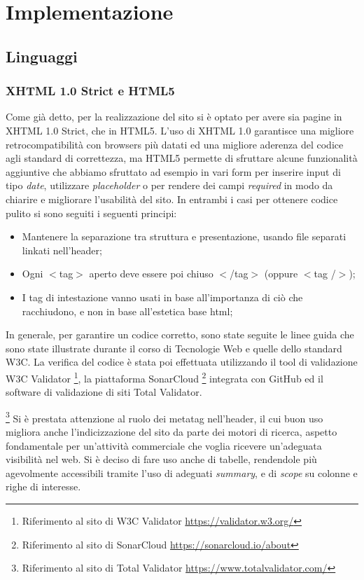\documentclass{article}
\begin{document}
	\section{Implementazione}
		
		\subsection{Linguaggi}
			
			\subsubsection{XHTML 1.0 Strict e HTML5}
			    Come già detto, per la realizzazione del sito si è optato per avere sia pagine in XHTML 1.0 Strict, che in HTML5. L'uso di XHTML 1.0 garantisce una migliore retrocompatibilità con browsers più datati ed una migliore aderenza del codice agli standard di correttezza, ma HTML5 permette di sfruttare alcune funzionalità aggiuntive che abbiamo sfruttato ad esempio in vari form per inserire input di tipo \textit{date}, utilizzare \textit{placeholder} o per rendere dei campi \textit{required} in modo da chiarire e migliorare l'usabilità del sito. In entrambi i casi per ottenere codice pulito si sono seguiti i seguenti principi:
			    \begin{itemize}
			        \item Mantenere la separazione tra struttura e presentazione, usando file separati linkati nell'header;
			        \item Ogni $<$tag$>$ aperto deve essere poi chiuso $<$/tag$>$ (oppure $<$tag /$>$);
			        \item I tag di intestazione vanno usati in base all'importanza di ciò che racchiudono, e non in base all'estetica base html;
			    \end{itemize}
			    
			     In generale, per garantire un codice corretto, sono state seguite le linee guida che sono state illustrate durante il corso di Tecnologie Web e quelle dello standard W3C. La verifica del codice è stata poi effettuata  utilizzando il tool di validazione W3C Validator%
			    \footnote{Riferimento al sito di W3C Validator \url{https://validator.w3.org/}},
			    la piattaforma SonarCloud 
			    \footnote{Riferimento al sito di SonarCloud \url{https://sonarcloud.io/about}}
			    integrata con GitHub
			    ed il software di validazione di siti Total Validator.%

			    \footnote{Riferimento al sito di Total Validator \url{https://www.totalvalidator.com/}}
			    \newline Si è prestata attenzione al ruolo dei metatag nell'header, il cui buon uso migliora anche l'indicizzazione del sito da parte dei motori di ricerca, aspetto fondamentale per un'attività commerciale che voglia ricevere un'adeguata visibilità nel web.
			    \newline Si è deciso di fare uso anche di tabelle, rendendole più agevolmente accessibili tramite l'uso di adeguati \textit{summary}, e di \textit{scope} su colonne e righe di interesse.
			
\end{document}
